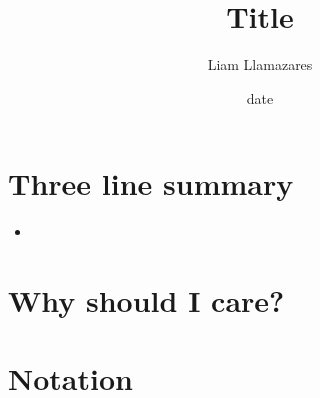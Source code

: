 \documentclass[12pt]{article}
\begin{document}
\title{Title}
\author{Liam Llamazares}
\date{date}
\maketitle
\section{ Three line summary}
\begin{itemize}
	\item
\end{itemize}
\section{Why should I care?}

\section{Notation}
\end{document}
